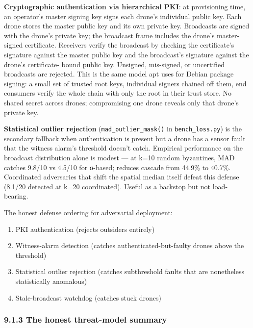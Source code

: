 \textbf{Cryptographic authentication via hierarchical PKI}: at
provisioning time, an operator's master signing key signs each drone's
individual public key. Each drone stores the master public key and its
own private key. Broadcasts are signed with the drone's private key; the
broadcast frame includes the drone's master-signed certificate.
Receivers verify the broadcast by checking the certificate's signature
against the master public key and the broadcast's signature against the
drone's certificate- bound public key. Unsigned, mis-signed, or
uncertified broadcasts are rejected. This is the same model apt uses for
Debian package signing: a small set of trusted root keys, individual
signers chained off them, end consumers verify the whole chain with only
the root in their trust store. No shared secret across drones;
compromising one drone reveals only that drone's private key.

\textbf{Statistical outlier rejection} (\texttt{mad\_outlier\_mask()} in
\texttt{bench\_loss.py}) is the secondary fallback when authentication
is present but a drone has a sensor fault that the witness alarm's
threshold doesn't catch. Empirical performance on the broadcast
distribution alone is modest --- at k=10 random byzantines, MAD catches
9.8/10 vs 4.5/10 for σ-based; reduces cascade from 44.9\% to 40.7\%.
Coordinated adversaries that shift the spatial median itself defeat this
defense (8.1/20 detected at k=20 coordinated). Useful as a backstop but
not load-bearing.

The honest defense ordering for adversarial deployment:

\begin{enumerate}
\def\labelenumi{\arabic{enumi}.}
\tightlist
\item
  PKI authentication (rejects outsiders entirely)
\item
  Witness-alarm detection (catches authenticated-but-faulty drones above
  the threshold)
\item
  Statistical outlier rejection (catches subthreshold faults that are
  nonetheless statistically anomalous)
\item
  Stale-broadcast watchdog (catches stuck drones)
\end{enumerate}

\subsubsection{9.1.3 The honest threat-model
summary}\label{the-honest-threat-model-summary}

